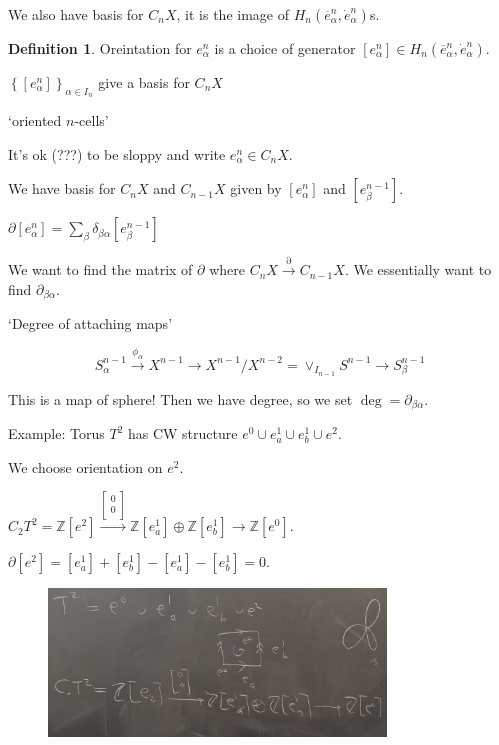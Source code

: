 \documentclass{article}
\theoremstyle{definition}
\newtheorem*{definition}{Definition}
\begin{document}
    We also have basis for \(C_n X\), it is the image of \(H_n(\overline{e}^n_\alpha, \dot{e}^n_\alpha)\)s.

    \begin{definition}
        Oreintation for \(e^n_\alpha\) is a choice of generator \([e^n_\alpha] \in H_n(\overline{e}^n_\alpha , \dot{e}^n_\alpha)\).
        
        \(\left\{ \left[ e^n_\alpha \right]  \right\}_{\alpha \in I_n}\) give a basis for \(C_n X\)
        
        `oriented \(n\)-cells'

        It's ok (???) to be sloppy and write \(e^n_{\alpha }\in C_n X\).
    \end{definition}

    We have basis for \(C_n X\) and \(C_{n-1} X\) given by \([e_\alpha^n]\) and \([e^{n-1}_\beta]\).
    
    \(\partial [e^n_\alpha] = \sum_{\beta} \delta_{\beta \alpha} [e_\beta^{n-1}]\)

    We want to find the matrix of \(\partial\) where \(C_n X \xrightarrow{\partial} C_{n-1} X\). We essentially want to find \(\partial_{\beta \alpha}\).
    
    `Degree of attaching maps'

    \[
        S_\alpha^{n-1} \xrightarrow{\phi_\alpha} X^{n-1} \to X^{n-1} / X^{n-2} = \vee_{I_{n-1}} S^{n-1} \to S_\beta^{n-1}
    \]

    This is a map of sphere! Then we have degree, so we set \(\deg = \partial_{\beta \alpha}\).

    Example: Torus \(T^2\) has CW structure \(e^0 \cup e^1_a \cup e^1_b \cup e^2\).

    We choose orientation on \(e^2\). 

    \(C_2 T^2 = \mathbb{Z}[e^2] \xrightarrow{\begin{bmatrix}
        0 \\
        0 \\
    \end{bmatrix}} \mathbb{Z}[e^{1}_a]\oplus \mathbb{Z}[e^1_b] \to \mathbb{Z}[e^0]\).
    
    \(\partial[e^2] = [e^1_a] + [e^1_b] - [e^1_a] - [e^1_b] = 0\).

    \begin{figure}[H]
        \centering
        \includegraphics[width=0.8\textwidth]{img/toruscell.jpg}
        \caption{}
        \label{fig:}
    \end{figure}
\end{document}
